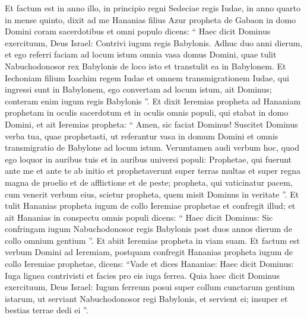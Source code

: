 \begin{biblechapter}
\begin{biblechapter}
\begin{biblechapter}
\begin{biblechapter}
\begin{biblechapter}
\begin{biblechapter}
\begin{biblechapter}
\begin{biblechapter}
\begin{biblechapter}
\begin{biblechapter}
\begin{biblechapter}
\begin{biblechapter}
\begin{biblechapter}
\begin{biblechapter}
\begin{biblechapter}
\begin{biblechapter}
\begin{biblechapter}
\begin{biblechapter}
\begin{biblechapter}
\begin{biblechapter}
\begin{biblechapter}
\begin{biblechapter}
\begin{biblechapter}
\begin{biblechapter}
\begin{biblechapter}
\begin{biblechapter}
\begin{biblechapter}
\begin{biblechapter}
\verse Et factum est in anno illo, in principio regni Sedeciae regis Iudae, in anno quarto in mense quinto, dixit ad me Hananias filius Azur propheta de Gabaon in domo Domini coram sacerdotibus et omni populo dicens: 
\verse “ Haec dicit Dominus exercituum, Deus Israel: Contrivi iugum regis Babylonis. 
\verse Adhuc duo anni dierum, et ego referri faciam ad locum istum omnia vasa domus Domini, quae tulit Nabuchodonosor rex Babylonis de loco isto et transtulit ea in Babylonem. 
 \verse Et Iechoniam filium Ioachim regem Iudae et omnem transmigrationem Iudae, qui ingressi sunt in Babylonem, ego convertam ad locum istum, ait Dominus; conteram enim iugum regis Babylonis ”. 
\verse Et dixit Ieremias propheta ad Hananiam prophetam in oculis sacerdotum et in oculis omnis populi, qui stabat in domo Domini, 
\verse et ait Ieremias propheta: “ Amen, sic faciat Dominus! Suscitet Dominus verba tua, quae prophetasti, ut referantur vasa in domum Domini et omnis transmigratio de Babylone ad locum istum. 
\verse Verumtamen audi verbum hoc, quod ego loquor in auribus tuis et in auribus universi populi: 
\verse Prophetae, qui fuerunt ante me et ante te ab initio et prophetaverunt super terras multas et super regna magna de proelio et de afflictione et de peste; 
\verse propheta, qui vaticinatur pacem, cum venerit verbum eius, scietur propheta, quem misit Dominus in veritate ”.
 \verse Et tulit Hananias propheta iugum de collo Ieremiae prophetae et confregit illud; 
\verse et ait Hananias in conspectu omnis populi dicens: “ Haec dicit Dominus: Sic confringam iugum Nabuchodonosor regis Babylonis post duos annos dierum de collo omnium gentium ”. Et abiit Ieremias propheta in viam suam.
 \verse Et factum est verbum Domini ad Ieremiam, postquam confregit Hananias propheta iugum de collo Ieremiae prophetae, dicens: 
\verse “Vade et dices Hananiae: Haec dicit Dominus: Iuga lignea contrivisti et facies pro eis iuga ferrea. 
\verse Quia haec dicit Dominus exercituum, Deus Israel: Iugum ferreum posui super collum cunctarum gentium istarum, ut serviant Nabuchodonosor regi Babylonis, et servient ei; insuper et bestias terrae dedi ei ”.

\end{biblechapter}
\end{biblechapter}
\end{biblechapter}
\end{biblechapter}
\end{biblechapter}
\end{biblechapter}
\end{biblechapter}
\end{biblechapter}
\end{biblechapter}
\end{biblechapter}
\end{biblechapter}
\end{biblechapter}
\end{biblechapter}
\end{biblechapter}
\end{biblechapter}
\end{biblechapter}
\end{biblechapter}
\end{biblechapter}
\end{biblechapter}
\end{biblechapter}
\end{biblechapter}
\end{biblechapter}
\end{biblechapter}
\end{biblechapter}
\end{biblechapter}
\end{biblechapter}
\end{biblechapter}
\end{biblechapter}
